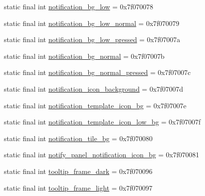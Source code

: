 \begin{DoxyCompactItemize}
\item 
static final int \mbox{\hyperlink{classandroid_1_1support_1_1v7_1_1appcompat_1_1_r_1_1drawable_a353cdafefc3107597d0db87596e73921}{notification\+\_\+bg\+\_\+low}} = 0x7f070078
\item 
static final int \mbox{\hyperlink{classandroid_1_1support_1_1v7_1_1appcompat_1_1_r_1_1drawable_a79aab8d64db424afe8354efa6ef5c26a}{notification\+\_\+bg\+\_\+low\+\_\+normal}} = 0x7f070079
\item 
static final int \mbox{\hyperlink{classandroid_1_1support_1_1v7_1_1appcompat_1_1_r_1_1drawable_a914244aa736aa82551d943d49ecb231f}{notification\+\_\+bg\+\_\+low\+\_\+pressed}} = 0x7f07007a
\item 
static final int \mbox{\hyperlink{classandroid_1_1support_1_1v7_1_1appcompat_1_1_r_1_1drawable_aca8ae4ace4f935b5e62999e5db787423}{notification\+\_\+bg\+\_\+normal}} = 0x7f07007b
\item 
static final int \mbox{\hyperlink{classandroid_1_1support_1_1v7_1_1appcompat_1_1_r_1_1drawable_ae4a93571a6bb07a75968c7a614532460}{notification\+\_\+bg\+\_\+normal\+\_\+pressed}} = 0x7f07007c
\item 
static final int \mbox{\hyperlink{classandroid_1_1support_1_1v7_1_1appcompat_1_1_r_1_1drawable_ac0ba483c1471e616dfdfc59676d504b7}{notification\+\_\+icon\+\_\+background}} = 0x7f07007d
\item 
static final int \mbox{\hyperlink{classandroid_1_1support_1_1v7_1_1appcompat_1_1_r_1_1drawable_a418857631140eaea9a0ba11fa60ab72e}{notification\+\_\+template\+\_\+icon\+\_\+bg}} = 0x7f07007e
\item 
static final int \mbox{\hyperlink{classandroid_1_1support_1_1v7_1_1appcompat_1_1_r_1_1drawable_a3854c021d5f0768bf8781b5e424e78e4}{notification\+\_\+template\+\_\+icon\+\_\+low\+\_\+bg}} = 0x7f07007f
\item 
static final int \mbox{\hyperlink{classandroid_1_1support_1_1v7_1_1appcompat_1_1_r_1_1drawable_a27e0dd01a8a504f46a6d181b3a3d8eb4}{notification\+\_\+tile\+\_\+bg}} = 0x7f070080
\item 
static final int \mbox{\hyperlink{classandroid_1_1support_1_1v7_1_1appcompat_1_1_r_1_1drawable_ad5705d42ed3ba126974cc60a647f361c}{notify\+\_\+panel\+\_\+notification\+\_\+icon\+\_\+bg}} = 0x7f070081
\item 
static final int \mbox{\hyperlink{classandroid_1_1support_1_1v7_1_1appcompat_1_1_r_1_1drawable_a5e1e725970e14ba17cf3ba19a4fccdc9}{tooltip\+\_\+frame\+\_\+dark}} = 0x7f070096
\item 
static final int \mbox{\hyperlink{classandroid_1_1support_1_1v7_1_1appcompat_1_1_r_1_1drawable_a0f8038bc0517156c3d94469744a30f8a}{tooltip\+\_\+frame\+\_\+light}} = 0x7f070097
\end{DoxyCompactItemize}
